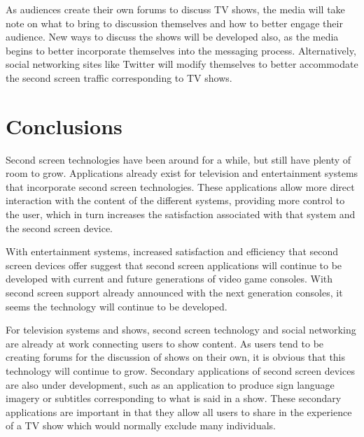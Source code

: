 \documentclass[11pt, oneside]{article}
\begin{document}
As audiences create their own forums to discuss TV shows, the media will take note on what to bring to discussion themselves and how to better engage their audience. New ways to discuss the shows will be developed also, as the media begins to better incorporate themselves into the messaging process. Alternatively, social networking sites like Twitter will modify themselves to better accommodate the second screen traffic corresponding to TV shows. 
%

\section{Conclusions}
Second screen technologies have been around for a while, but still have plenty of room to grow. Applications already exist for television and entertainment systems that incorporate second screen technologies. These applications allow more direct interaction with the content of the different systems, providing more control to the user, which in turn increases the satisfaction associated with that system and the second screen device. 
 
With entertainment systems, increased satisfaction and efficiency that second screen devices offer suggest that second screen applications will continue to be developed with current and future generations of video game consoles. With second screen support already announced with the next generation consoles, it seems the technology will continue to be developed. 

For television systems and shows, second screen technology and social networking are already at work connecting users to show content. As users tend to be creating forums for the discussion of shows on their own, it is obvious that this technology will continue to grow. Secondary applications of second screen devices are also under development, such as an application to produce sign language imagery or subtitles corresponding to what is said in a show. These secondary applications are important in that they allow all users to share in the experience of a TV show which would normally exclude many individuals.
\end{document}
